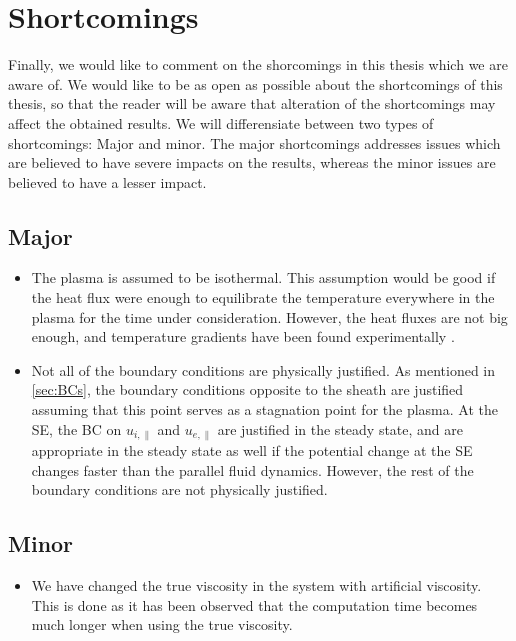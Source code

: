 \section{Shortcomings}
\label{app:shortcomings}
%
Finally, we would like to comment on the shorcomings in this thesis which we are aware of.
We would like to be as open as possible about the shortcomings of this thesis, so that the reader will be aware that alteration of the shortcomings may affect the obtained results.
We will differensiate between two types of shortcomings:
Major and minor.
The major shortcomings addresses issues which are believed to have severe impacts on the results, whereas the minor issues are believed to have a lesser impact.

\subsection{Major}
\begin{itemize}[noitemsep,nolistsep]
    \item The plasma is assumed to be isothermal.
        This assumption would be good if the heat flux were enough to equilibrate the temperature everywhere in the plasma for the time under consideration.
        However, the heat fluxes are not big enough, and temperature gradients have been found experimentally \cite{Schroder2003Phd}.
    \item Not all of the boundary conditions are physically justified.
        As mentioned in \cref{sec:BCs}, the boundary conditions opposite to the sheath are justified assuming that this point serves as a stagnation point for the plasma.
        At the SE, the BC on $u_{i,\|}$ and $u_{e,\|}$ are justified in the steady state, and are appropriate in the steady state as well if the potential change at the SE changes faster than the parallel fluid dynamics.
        However, the rest of the boundary conditions are not physically justified.
\end{itemize}

\subsection{Minor}
\begin{itemize}[noitemsep,nolistsep]
    \item We have changed the true viscosity in the system with artificial viscosity.
        This is done as it has been observed that the computation time becomes much longer when using the true viscosity.
\end{itemize}
